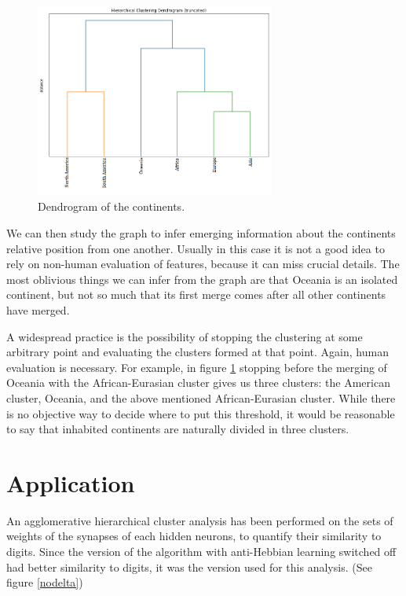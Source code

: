 \documentclass[a4paper]{report}
\begin{document}
\begin{figure} [H]
\centering
\includegraphics [width=0.7\textwidth] {o/continents.png}
\caption{Dendrogram of the continents.}
\label{conte}
\end{figure}

We can then study the graph to infer emerging information about the continents relative position from one another.
Usually in this case it is not a good idea to rely on non-human evaluation of features, because it can miss crucial details.
The most oblivious things we can infer from the graph are that Oceania is an isolated continent, but not so much that its first merge comes after all other continents have merged.

A widespread practice is the possibility of stopping the clustering at some arbitrary point and evaluating the clusters formed at that point.
Again, human evaluation is necessary.
For example, in figure \ref{conte} stopping before the merging of Oceania with the African-Eurasian cluster gives us three clusters:
the American cluster, Oceania, and the above mentioned African-Eurasian cluster.
While there is no objective way to decide where to put this threshold, it would be reasonable to say that inhabited continents are naturally divided in three clusters.

\section{Application}

An agglomerative hierarchical cluster analysis has been performed on the sets of weights of the synapses of each hidden neurons, to quantify their similarity to digits.
Since the version of the algorithm with anti-Hebbian learning switched off had better similarity to digits, it was the version used for this analysis.
(See figure \ref{nodelta})
\end{document}
